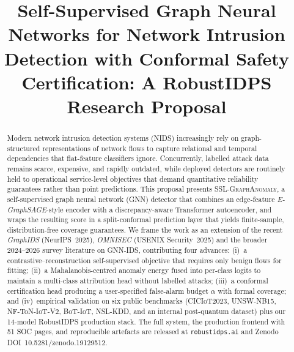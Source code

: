 \documentclass[journal,twoside]{IEEEtran}
\begin{document}
\title{Self-Supervised Graph Neural Networks for Network Intrusion Detection with Conformal Safety Certification: A RobustIDPS Research Proposal}

\author{%
  \and
}

\maketitle

\begin{abstract}
Modern network intrusion detection systems (NIDS) increasingly rely on
graph-structured representations of network flows to capture relational and
temporal dependencies that flat-feature classifiers ignore.  Concurrently,
labelled attack data remains scarce, expensive, and rapidly outdated, while
deployed detectors are routinely held to operational service-level objectives
that demand quantitative reliability guarantees rather than point predictions.
This proposal presents \textsc{SSL-GraphAnomaly}, a self-supervised graph
neural network (GNN) detector that combines an edge-feature
\emph{E-GraphSAGE}-style encoder with a discrepancy-aware Transformer
autoencoder, and wraps the resulting score in a split-conformal prediction
layer that yields finite-sample, distribution-free coverage guarantees.
We frame the work as an extension of the recent \emph{GraphIDS}
(NeurIPS~2025), \emph{OMNISEC} (USENIX Security~2025) and the broader 2024--2026
survey literature on GNN-IDS, contributing four advances: (i)~a
contrastive--reconstruction self-supervised objective that requires only
benign flows for fitting; (ii)~a Mahalanobis-centred anomaly energy fused
into per-class logits to maintain a multi-class attribution head without
labelled attacks; (iii)~a conformal certification head producing a
user-specified false-alarm budget $\alpha$ with formal coverage; and
(iv)~empirical validation on six public benchmarks (CICIoT2023, UNSW-NB15,
NF-ToN-IoT-V2, BoT-IoT, NSL-KDD, and an internal post-quantum dataset)
plus our 14-model RobustIDPS production stack.  The full system,
the production frontend with 51 SOC pages, and reproducible artefacts
are released at \texttt{robustidps.ai} and Zenodo
DOI~10.5281/zenodo.19129512.
\end{abstract}
\end{document}
